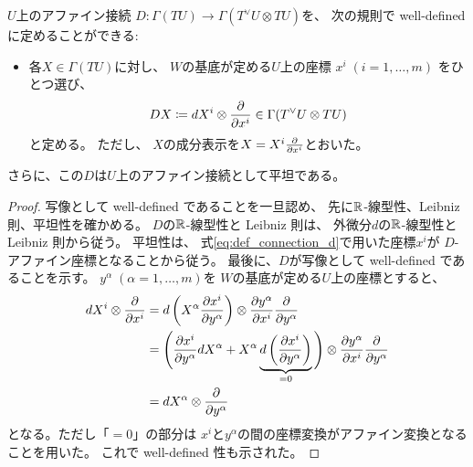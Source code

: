 \documentclass[report]{jlreq}
\begin{document}
\begin{propdef}[$U$上の平坦アファイン接続]
    $U$上のアファイン接続
    $D \colon \Gamma(TU) \to \Gamma(T^\vee U \otimes TU)$を、
    次の規則で well-defined に定めることができる:
    \begin{itemize}
        \item 各$X \in \Gamma(TU)$に対し、
            $W$の基底が定める$U$上の座標
            $x^i \; (i = 1, \dots, m)$
            をひとつ選び、
            \begin{equation}
                \label{eq:def_connection_d}
                DX
                    \coloneqq dX^i \otimes \deldel{x^i}
                    \in \Gamma(T^\vee U \otimes TU)
            \end{equation}
            と定める。
            ただし、
            $X$の成分表示を$X = X^i \deldel{x^i}$とおいた。
    \end{itemize}
    さらに、この$D$は$U$上のアファイン接続として平坦である。
\end{propdef}

\begin{proof}
    写像として well-defined であることを一旦認め、
    先に$\mathbb{R}$-線型性、Leibniz 則、平坦性を確かめる。
    $D$の$\mathbb{R}$-線型性と Leibniz 則は、
    外微分$d$の$\mathbb{R}$-線型性と Leibniz 則から従う。
    平坦性は、
    式\cref{eq:def_connection_d}で用いた座標$x^i$が
    $D$-アファイン座標となることから従う。
    最後に、$D$が写像として well-defined であることを示す。
    $y^\alpha \; (\alpha = 1, \dots, m)$を
    $W$の基底が定める$U$上の座標とすると、
    \begin{alignat}{1}
        dX^i \otimes \deldel{x^i}
            &=
                d\myparen{
                    X^\alpha \deldel[x^i]{y^\alpha}
                }
                \otimes
                \deldel[y^\alpha]{x^i}
                \deldel{y^\alpha}
                \\
            &=
                \Bigg(
                    \deldel[x^i]{y^\alpha} dX^\alpha
                    +
                    X^\alpha \underbrace{
                        d\myparen{
                            \deldel[x^i]{y^\alpha}
                        }
                    }_{=0}
                \Bigg)
                \otimes
                \deldel[y^\alpha]{x^i}
                \deldel{y^\alpha}
                \\
            &=
                dX^\alpha
                \otimes
                \deldel{y^\alpha}
    \end{alignat}
    となる。ただし「$= 0$」の部分は
    $x^i$と$y^\alpha$の間の座標変換がアファイン変換となることを用いた。
    これで well-defined 性も示された。
\end{proof}
\end{document}
